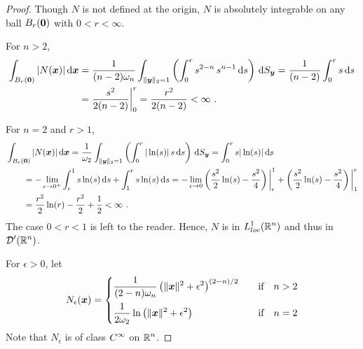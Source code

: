 \begin{proof}
Though $N$ is not defined at the origin, $N$ is absolutely integrable
on any ball $B_r({\bm{0}})$ with $0<r<\infty$.

For $n>2$,
\begin{align*}
\int_{B_r({\bm{0}})} |N({\bm{x}})| \,\mathrm{d}{{\bm{x}}}
&= \frac{1}{(n-2)\omega_n}
\int_{\|{\bm{y}}\|_2 =1} \left( \int_0^r s^{2-n} \, s^{n-1} \,\mathrm{d}{s} \right)
\,\mathrm{d}{S}_{{\bm{y}}}
= \frac{1}{(n-2)} \int_0^r s \,\mathrm{d}{s} \\
&= \frac{s^2}{2(n-2)}\bigg|_0^r = \frac{r^2}{2(n-2)} < \infty \ .
\end{align*}

For $n=2$ and $r>1$,
\begin{align*}
&\int_{B_r({\bm{0}})} |N({\bm{x}})| \,\mathrm{d}{{\bm{x}}}
= \frac{1}{\omega_2}
\int_{\|{\bm{y}}\|_2 =1} \left( \int_0^r |\ln(s)| \, s \,\mathrm{d}{s} \right) \,\mathrm{d}{S}_{{\bm{y}}}
= \int_0^r s |\ln(s)| \,\mathrm{d}{s} \\
&\qquad = -\lim_{\epsilon \to 0^+} \int_\epsilon^1 s\ln(s) \,\mathrm{d}{s}  
+ \int_1^r s\ln(s) \,\mathrm{d}{s}  
= -\lim_{\epsilon \to 0} \left( \frac{s^2}{2}\ln(s) - \frac{s^2}{4}
\right)\bigg|_\epsilon^1
+ \left( \frac{s^2}{2}\ln(s) - \frac{s^2}{4} \right)\bigg|_1^r \\
&\qquad = \frac{r^2}{2}\ln(r) - \frac{r^2}{2} + \frac{1}{2} < \infty \ .
\end{align*}
The case $0<r<1$ is left to the reader.
Hence, $N$ is in $\displaystyle L^1_{loc}(\mathbb{R}^n)$ and thus in
$\displaystyle \mathcal{D}'(\mathbb{R}^n)$.

For $\epsilon >0$, let
\[
N_\epsilon({\bm{x}}) =
\begin{cases}
\displaystyle \frac{1}{(2-n)\omega_n}
\left( \|{\bm{x}}\|^2 + \epsilon^2\right)^{(2-n)/2} & \quad 
\text{if} \quad n>2 \\[1em]
\displaystyle \frac{1}{2\omega_2}
\ln\left(\|{\bm{x}}\|^2 + \epsilon^2 \right) & \quad 
\text{if} \quad n=2
\end{cases}
\]
Note that $N_\epsilon$ is of class $\displaystyle C^{\infty}$ on
$\displaystyle \mathbb{R}^n$.


\end{proof}
